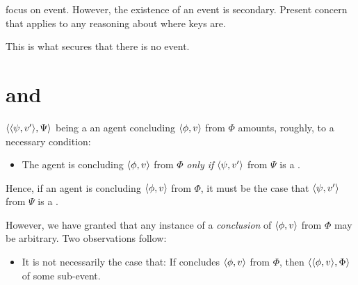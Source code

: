 \begin{note}
   focus on event.
  However, the existence of an event is secondary.
  Present concern that applies to any reasoning about where keys are.

  This is what secures that there is no event.
\end{note}


\section{ and \tC{}}
\label{sec:typicalRequs}

\begin{note}
  \(\langle \langle \psi, v' \rangle, \Psi \rangle\) being a  an agent concluding \(\langle \phi, v \rangle\) from \(\Phi\) amounts, roughly, to a necessary condition:
  \begin{itemize}
  \item
    The agent is concluding \(\langle \phi, v \rangle\) from \(\Phi\) \emph{only if} \(\langle \psi, v' \rangle\) from \(\Psi\) is a \fc{}.
  \end{itemize}

  Hence, if an agent is concluding \(\langle \phi, v \rangle\) from \(\Phi\), it must be the case that \(\langle \psi, v' \rangle\) from \(\Psi\) is a \fc{}.

  However, we have granted that any instance of a \emph{conclusion} of \(\langle \phi, v \rangle\) from \(\Phi\) may be arbitrary.
  Two observations follow:

  \begin{observation}
    \label{prop:requ-not-refl}

    \begin{itemize}
    \item
      It is not necessarily the case that:
      If \vAgent{} concludes \(\langle \phi, v \rangle\) from \(\Phi\), then \(\langle \langle \phi, v \rangle, \Phi \rangle\) \requ{} of some sub-event.
    \end{itemize}
    \vspace{-\baselineskip}
  \end{observation}


\end{note}
